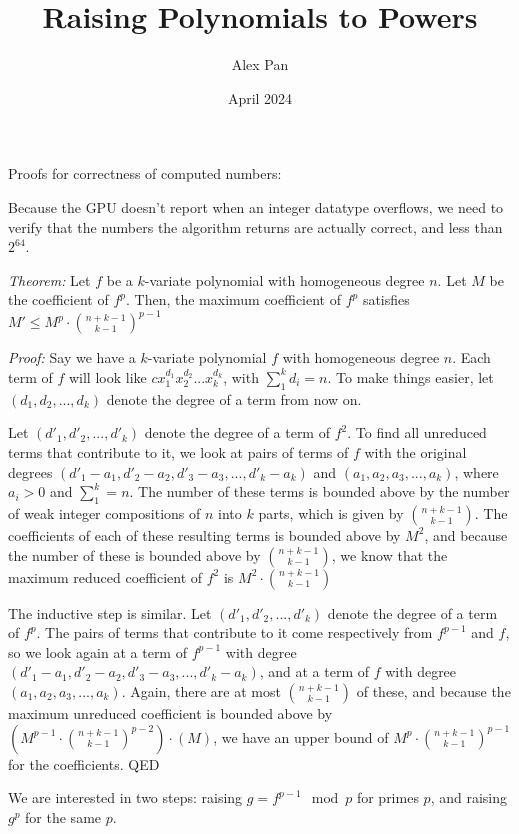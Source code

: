 \documentclass{article}
\title{Raising Polynomials to Powers}
\author{Alex Pan}
\date{April 2024}
\begin{document}
\maketitle

Proofs for correctness of computed numbers:

Because the GPU doesn't report when an integer datatype overflows, we need to verify that the numbers the algorithm returns are actually correct, and less than $2^{64}$.

\textit{Theorem: } Let $f$ be a $k$-variate polynomial with homogeneous degree $n$. Let $M$ be the coefficient of $f^p$. Then, the maximum coefficient of $f^p$ satisfies $M' \le M^p \cdot \binom{n + k - 1}{k - 1}^{p-1}$

\textit{Proof: } Say we have a $k$-variate polynomial $f$ with homogeneous degree $n$. Each term of $f$ will look like $cx_{1}^{d_1}x_{2}^{d_2}...x_{k}^{d_k}$, with $ \sum_{1}^{k} d_i = n$. To make things easier, let $(d_1, d_2, ... , d_k)$ denote the degree of a term from now on.

Let $(d'_1, d'_2, ... , d'_k)$ denote the degree of a term of $f^2$. To find all unreduced terms that contribute to it, we look at pairs of terms of $f$ with the original degrees $(d'_1 - a_1, d'_2 - a_2, d'_3 - a_3, ... , d'_k - a_k)$ and $(a_1, a_2, a_3, ... , a_k)$, where $a_i > 0$ and $\sum_{1}^{k} = n$. The number of these terms is bounded above by the number of weak integer compositions of $n$ into $k$ parts, which is given by $\binom{n + k - 1}{k - 1}$. The coefficients of each of these resulting terms is bounded above by $M^2$, and because the number of these is bounded above by $\binom{n + k - 1}{k - 1}$, we know that the maximum reduced coefficient of $f^2$ is $M^2 \cdot \binom{n + k - 1}{k - 1}$

The inductive step is similar. Let $(d'_1, d'_2, ... , d'_k)$ denote the degree of a term of $f^p$. The pairs of terms that contribute to it come respectively from $f^{p - 1}$ and $f$, so we look again at a term of $f^{p - 1}$ with degree $(d'_1 - a_1, d'_2 - a_2, d'_3 - a_3, ... , d'_k - a_k)$, and at a term of $f$ with degree $(a_1, a_2, a_3, ... , a_k)$. Again, there are at most $\binom{n + k - 1}{k - 1}$ of these, and because the maximum unreduced coefficient is bounded above by $\left(M^{p - 1} \cdot \binom{n + k - 1}{k - 1} ^ {p - 2}\right) \cdot (M)$, we have an upper bound of $M^p \cdot \binom{n + k - 1}{k - 1}^{p-1}$ for the coefficients. QED

We are interested in two steps: raising $g = f^{p - 1}\mod p$ for primes $p$, and raising $g ^ p$ for the same $p$.
\end{document}
